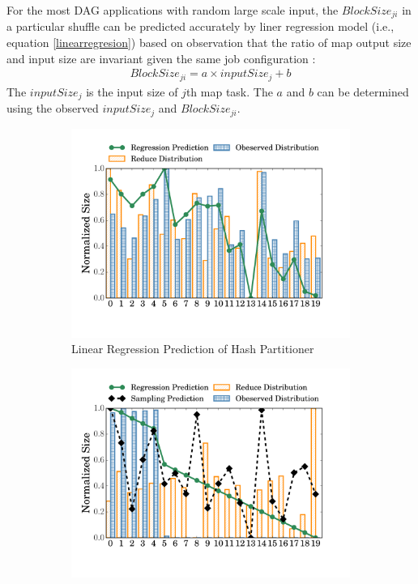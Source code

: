 For the most DAG applications with random large scale input, 
the $BlockSize_{ji}$ in a particular shuffle can be predicted accurately by liner regression model (i.e., equation \ref{linearregresion}) based on observation that the ratio of map output size and input size are invariant given the same job configuration \cite{guo2017ishuffle, predict}: 
\begin{equation}
\label{linearregresion}
\begin{aligned}
	BlockSize_{ji} = a \times inputSize_j + b
\end{aligned}
\end{equation}
The $inputSize_j$ is the input size of $j$th map task. 
The $a$ and $b$ can be determined using the observed $inputSize_j$ and $BlockSize_{ji}$.

\begin{figure}
	\centering
	\begin{subfigure}[b]{0.31\linewidth}
		\includegraphics[width=\linewidth]{fig/hash_pre}
		\caption{Linear Regression Prediction of Hash Partitioner\newline}
		\label{fig:hash_pre}
	\end{subfigure}
	\begin{subfigure}[b]{0.31\linewidth}
		\includegraphics[width=\linewidth]{fig/range_pre_sample}

\end{subfigure}
\end{figure}
